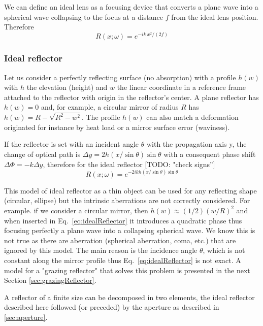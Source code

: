 \documentclass{iucr}              %
\newcommand{\todo}[1]{{\color{red}[TODO: "#1'']}}
\begin{document}
We can define an ideal lens as a focusing device that converts a plane wave into a spherical wave collapsing to the focus at a distance $f$ from the ideal lens position. Therefore
\begin{equation}
    R(x;\omega) = e^{-i k~x^2/(2 f)}
\end{equation}

\subsubsection{Ideal reflector}
\label{sec:idealReflector}

Let us consider a perfectly reflecting surface (no absorption) with a profile $h(w)$ with $h$ the elevation (height) and $w$ the linear coordinate in a reference frame attached to the reflector with origin in the reflector's center. A plane reflector has $h(w)=0$ and, for example, a circular mirror of radius $R$ has $h(w)=R-\sqrt{R^2 - w^2}$. The profile $h(w)$ can also match a deformation originated for instance by heat load or a mirror surface error (waviness).

If the reflector is set with an incident angle $\theta$ with the propagation axis y, the change of optical path is $\Delta y = 2 h(x/\sin \theta) \sin \theta$ with a consequent phase shift $\Delta \Phi = - k \Delta y $, therefore for the ideal reflector \todo{check signs}
\begin{equation}
\label{eq:idealReflector}
    R(x;\omega) = e^{-2 i k h(x/\sin \theta) \sin \theta}
\end{equation} 

This model of ideal reflector as a thin object  can be used for any reflecting shape (circular, ellipse) but the intrinsic aberrations are not correctly considered. For example. if we consider a circular mirror, then $h(w) \approx (1/2) (w/R)^2$ and when inserted in Eq.~\ref{eq:idealReflector} it introduces a quadratic phase thus focusing perfectly a plane wave into a collapsing spherical wave. We know this is not true as there are aberration (spherical aberration, coma, etc.) that are ignored by this model. The main reason is the incidence angle $\theta$, which is not constant along the mirror profile thus Eq.~\ref{eq:idealReflector} is not exact. A model for a "grazing reflector" that solves this problem is presented in the next Section \ref{sec:grazingReflector}.

A reflector of a finite size can be decomposed in two elements, the ideal reflector described here followed (or preceded) by the aperture as described in \ref{sec:aperture}.
\end{document}
